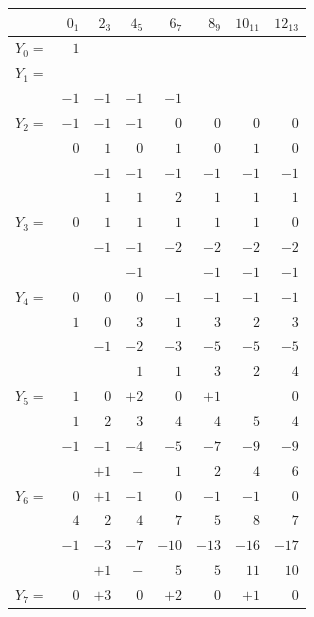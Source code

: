 \documentclass[11pt]{article}
\begin{document}
\begin{center}\small
\begin{tabular}{l|rrrrrrr}
          & $0_{1}$ & $2_{3}$ & $4_{5}$ & $6_{7}$ & $8_{9}$ & $10_{11}$ & $12_{13}$ \\\hline
$Y_{0}=$  & $1$     &         &         &         &         &           &           \\\hline
$Y_{1}=$  &         &         &         &         &         &           &           \\
          & $-1$    & $-1$    & $-1$    & $-1$    &         &           &           \\\hline
$Y_{2}=$  & $-1$    & $-1$    & $-1$    & $0$     & $0$     & $0$       & $0$       \\
          & $0$     & $1$     & $0$     & $1$     & $0$     & $1$       & $0$       \\
          &         & $-1$    & $-1$    & $-1$    & $-1$    & $-1$      & $-1$      \\
          &         & $1$     & $1$     & $2$     & $1$     & $1$       & $1$       \\\hline
$Y_{3}=$  & $0$     & $1$     & $1$     & $1$     & $1$     & $1$       & $0$       \\
          &         & $-1$    & $-1$    & $-2$    & $-2$    & $-2$      & $-2$      \\
          &         &         & $-1$    &         & $-1$    & $-1$      & $-1$      \\\hline
$Y_{4}=$  & $0$     & $0$     & $0$     & $-1$    & $-1$    & $-1$      & $-1$      \\
          & $1$     & $0$     & $3$     & $1$     & $3$     & $2$       & $3$       \\
          &         & $-1$    & $-2$    & $-3$    & $-5$    & $-5$      & $-5$      \\
          &         &         & $1$     & $1$     & $3$     & $2$       & $4$       \\\hline
$Y_{5}=$  & $1$     & $0$     & $+2$    & $0$     & $+1$    &           & $0$       \\
          & $1$     & $2$     & $3$     & $4$     & $4$     & $5$       & $4$       \\
          & $-1$    & $-1$    & $-4$    & $-5$    & $-7$    & $-9$      & $-9$      \\
          &         & $+1$    & $-$     & $1$     & $2$     & $4$       & $6$       \\\hline
$Y_{6}=$  & $0$     & $+1$    & $-1$    & $0$     & $-1$    & $-1$      & $0$       \\
          & $4$     & $2$     & $4$     & $7$     & $5$     & $8$       & $7$       \\
          & $-1$    & $-3$    & $-7$    & $-10$   & $-13$   & $-16$     & $-17$     \\
          &         & $+1$    & $-$     & $5$     & $5$     & $11$      & $10$      \\\hline
$Y_{7}=$  & $0$     & $+3$    & $0$     & $+2$    & $0$     & $+1$      & $0$       \\
\end{tabular}
\end{center}
\end{document}
